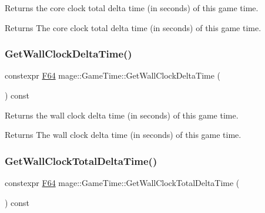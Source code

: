 Returns the core clock total delta time (in seconds) of this game time.

\begin{DoxyReturn}{Returns}
The core clock total delta time (in seconds) of this game time. 
\end{DoxyReturn}
\hypertarget{classmage_1_1_game_time_a2ff13142221349d3368645bcbe0cfb8d}{}\label{classmage_1_1_game_time_a2ff13142221349d3368645bcbe0cfb8d} 
\subsubsection{\texorpdfstring{Get\+Wall\+Clock\+Delta\+Time()}{GetWallClockDeltaTime()}}
{\footnotesize\ttfamily constexpr \hyperlink{namespacemage_ad26233bbec640deda836e572c1a23708}{F64} mage\+::\+Game\+Time\+::\+Get\+Wall\+Clock\+Delta\+Time (\begin{DoxyParamCaption}{ }\end{DoxyParamCaption}) const\hspace{0.3cm}{\ttfamily [noexcept]}}

Returns the wall clock delta time (in seconds) of this game time.

\begin{DoxyReturn}{Returns}
The wall clock delta time (in seconds) of this game time. 
\end{DoxyReturn}
\hypertarget{classmage_1_1_game_time_a75c3675ead79cd32c9d77c70f3bd67ba}{}\label{classmage_1_1_game_time_a75c3675ead79cd32c9d77c70f3bd67ba} 
\subsubsection{\texorpdfstring{Get\+Wall\+Clock\+Total\+Delta\+Time()}{GetWallClockTotalDeltaTime()}}
{\footnotesize\ttfamily constexpr \hyperlink{namespacemage_ad26233bbec640deda836e572c1a23708}{F64} mage\+::\+Game\+Time\+::\+Get\+Wall\+Clock\+Total\+Delta\+Time (\begin{DoxyParamCaption}{ }\end{DoxyParamCaption}) const\hspace{0.3cm}{\ttfamily [noexcept]}}

